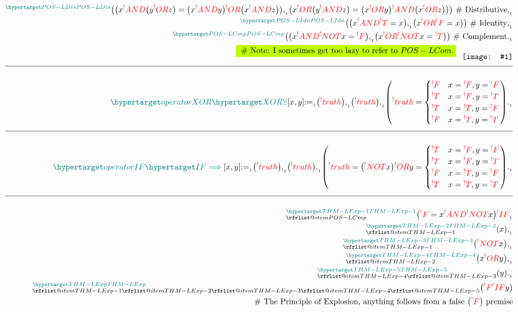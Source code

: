 \documentclass[a4paper]{article}
\makeatletter
\def\ml{\mleft}
\def\mr{\mright}
\newcommand*{\img}[1]{%
    \raisebox{-0.5\baselineskip}{%
        \texttt{[image: \#1]}%
    }%
}
\newcommand{\tdb}[1]{\colorbox{lime}{$\displaystyle #1$}}
\newcommand{\defeq}{:=}
\newcommand{\eq}{=}
\newcommand{\cusand}{,}
\newcommand{\cusend}{.}
\newcommand{\cusnum}[2]{{#1}_{{\phantom{ }}_{#2}}}
\newcommand{\eqComment}[1]{\text{  \# #1}}
\newcommand{\n}{\\[1.5ex] \hline \nonumber \\[0ex]}
\newcommand{\m}{\nonumber \\}
\newcommand\rfrlist[1]{%
    \forcsvlist{\rfrlist@item}{#1}
}
\newcommand\rfrlist@item[1]{\rfr{#1}\\}
\newcommand{\thmlink}[2]{{}_{\substack{\rfrlist{#1}}}^{\dfn{#2}} }
\makeatother
\begin{document}
\begin{tcolorbox}
\begin{align}
\m \thmlink{}{POS-LDis} \ml(\ml(x \rfr{AND} \ml(y \rfr{OR} z\mr) \eq \ml(x \rfr{AND} y\mr) \rfr{OR} \ml(x \rfr{AND} z\mr)\mr) \cusnum{\cusand}{1} \ml(x \rfr{OR} \ml(y \rfr{AND} z\mr) \eq \ml(x \rfr{OR} y\mr) \rfr{AND} \ml(x \rfr{OR} z\mr)\mr)\mr) \eqComment{Distributive} \cusnum{\cusand}{1}
\m \thmlink{}{POS-LIdn} \ml(\ml(x \rfr{AND} \rfr{T} \eq x\mr) \cusnum{\cusand}{1} \ml(x \rfr{OR} \rfr{F} \eq x\mr)\mr) \eqComment{Identity} \cusnum{\cusand}{1}
\m \thmlink{}{POS-LCmp} \ml(\ml(x \rfr{AND} \rfr{NOT} x \eq \rfr{F}\mr) \cusnum{\cusand}{1} \ml(x \rfr{OR} \rfr{NOT} x \eq \rfr{T}\mr)\mr) \eqComment{Complement} \cusnum{\cusend}{1}
\m \tdb{\eqComment{Note: I sometimes get too lazy to refer to $POS-LCom$.}} \phantom{\_} \img{my-b.jpg}
    \n \dfn{operatorXOR} [\dfn{XOR}[\veebar]][x, y] \cusnum{\defeq}{1} \ml(\rfr{truth} [x][]\mr) \cusnum{\cusand}{1} \ml(\rfr{truth} [y][]\mr) \cusnum{\cusand}{1} \ml(\rfr{truth} [x \rfr{XOR} y][] \eq \begin{cases} \rfr{F} & x \eq \rfr{F} \cusand y \eq \rfr{F} \\ \rfr{T} & x \eq \rfr{F} \cusand y \eq \rfr{T} \\ \rfr{T} & x \eq \rfr{T} \cusand y \eq \rfr{F} \\ \rfr{F} & x \eq \rfr{T} \cusand y \eq \rfr{T} \end{cases}\mr) \cusnum{\cusend}{1}
    \n \dfn{operatorIF} [\dfn{IF}[\implies]][x, y] \cusnum{\defeq}{1} \ml(\rfr{truth} [x][]\mr) \cusnum{\cusand}{1} \ml(\rfr{truth} [y][]\mr) \cusnum{\cusand}{1} \ml(\rfr{truth} [x \rfr{IF} y][] \eq \ml(\rfr{NOT} x\mr) \rfr{OR} y \eq \begin{cases} \rfr{T} & x \eq \rfr{F} \cusand y \eq \rfr{F} \\ \rfr{T} & x \eq \rfr{F} \cusand y \eq \rfr{T} \\ \rfr{F} & x \eq \rfr{T} \cusand y \eq \rfr{F} \\ \rfr{T} & x \eq \rfr{T}\cusand y \eq \rfr{T} \end{cases}\mr) \cusnum{\cusend}{1}
    \n \thmlink{POS-LCmp}{THM-LExp-1} \ml(\rfr{F} \eq x \rfr{AND} \rfr{NOT} x\mr) \cusnum{\rfr{IF}}{1}
\m \thmlink{THM-LExp-1}{THM-LExp-2} \ml(x\mr) \cusnum{\cusand}{1}
\m \thmlink{THM-LExp-1}{THM-LExp-3} \ml(\rfr{NOT} x\mr) \cusnum{\cusand}{1}
\m \thmlink{THM-LExp-2}{THM-LExp-4} \ml(x \rfr{OR} y\mr) \cusnum{\cusand}{1}
\m \thmlink{THM-LExp-4, THM-LExp-3}{THM-LExp-5} \ml(y\mr) \cusnum{\cusend}{1}
\m \thmlink{THM-LExp-1, THM-LExp-2, THM-LExp-3, THM-LExp-4, THM-LExp-5}{THM-LExp} \ml(\rfr{F} \rfr{IF} y\mr)
\m \eqComment{The Principle of Explosion, anything follows from a false $\ml(\rfr{F}\mr)$ premise}

\end{align}
\end{tcolorbox}
\end{document}
